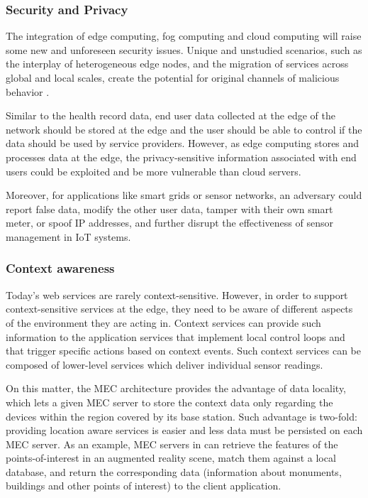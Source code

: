 \documentclass{ieeeaccess}
\begin{document}
\subsubsection{Security and Privacy}

The integration of edge computing, fog computing and cloud computing will raise some new and unforeseen security issues. Unique and unstudied scenarios, such as the interplay of heterogeneous edge nodes, and the migration of services across global and local scales, create the potential for original channels of malicious behavior \cite{edge-computing-survey}.

Similar to the health record data, end user data collected at the edge of the network should be stored at the edge and the user should be able to control if the data should be used by service providers. However, as edge computing stores and processes data at the edge, the privacy-sensitive information associated with end users could be exploited and be more vulnerable than cloud servers.

Moreover, for applications like smart grids or sensor networks, an adversary could report false data, modify the other user data, tamper with their own smart meter, or spoof IP addresses, and further disrupt the effectiveness of sensor management in IoT systems.

\subsubsection{Context awareness}

Today's web services are rarely context-sensitive. However, in order to support context-sensitive services at the edge, they need to be aware of different aspects of the environment they are acting in. Context services can provide such information to the application services that implement local control loops and that trigger specific actions based on context events. Such context services can be composed of lower-level services which deliver individual sensor readings.

On this matter, the MEC architecture provides the advantage of data locality, which lets a given MEC server to store the context data only regarding the devices within the region covered by its base station. Such advantage is two-fold: providing location aware services is easier and less data must be persisted on each MEC server. As an example, MEC servers in \cite{mobile-augmented-reality} can retrieve the features of the points-of-interest in an augmented reality scene, match them against a local database, and return the corresponding data (information about monuments, buildings and other points of interest) to the client application.
\end{document}
